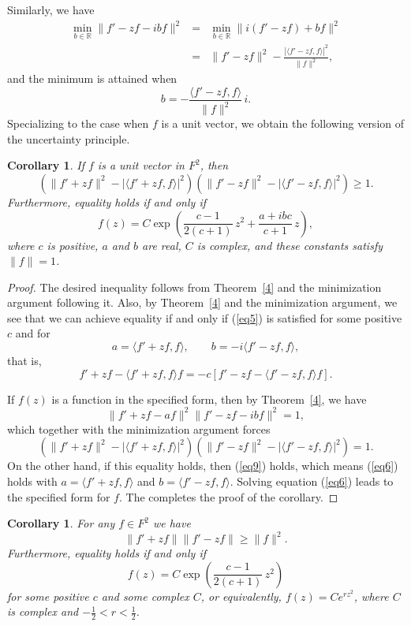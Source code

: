 \documentclass[12pt,reqno]{amsart}
\newtheorem{cor}[thm]{Corollary}
\begin{document}
Similarly, we have
\begin{eqnarray*}
\min_{b\in{{\mathbb R}}}\|f'-zf-ibf\|^2&=&\min_{b\in{{\mathbb R}}}\|i(f'-zf)+bf\|^2\\
&=&\|f'-zf\|^2-\frac{|\langle f'-zf,f\rangle|^2}{\|f\|^2},
\end{eqnarray*}
and the minimum is attained when 
$$b=-\frac{\langle f'-zf,f\rangle}{\|f\|^2}\,i.$$
Specializing to the case when $f$ is a unit vector, we obtain the following version of the uncertainty principle.

\begin{cor}
If $f$ is a unit vector in $F^2$, then
$$(\|f'+zf\|^2-|\langle f'+zf,f\rangle|^2)(\|f'-zf\|^2-|\langle f'-zf,f\rangle|^2)\ge1.$$
Furthermore, equality holds if and only if 
$$f(z)=C\exp\left(\frac{c-1}{2(c+1)}\,z^2+\frac{a+ibc}{c+1}\,z\right),$$
where $c$ is positive, $a$ and $b$ are real, $C$ is complex, and these constants satisfy $\|f\|=1$.
\label{5}
\end{cor}

\begin{proof}
The desired inequality follows from Theorem~\ref{4} and the minimization argument following it. 
Also, by Theorem~\ref{4} and the minimization argument, we see that we can achieve equality 
if and only if (\ref{eq5}) is satisfied for some positive $c$ and for
$$a=\langle f'+zf,f\rangle,\qquad b=-i\langle f'-zf,f\rangle,$$
that is,
\begin{equation}
f'+zf-\langle f'+zf,f\rangle f=-c\left[f'-zf-\langle f'-zf,f\rangle f\right].
\label{eq9}
\end{equation}

If $f(z)$ is a function in the specified form, then by Theorem~\ref{4}, we have
$$\|f'+zf-af\|^2\|f'-zf-ibf\|^2=1,$$
which together with the minimization argument forces
$$(\|f'+zf\|^2-|\langle f'+zf,f\rangle|^2)(\|f'-zf\|^2-|\langle f'-zf,f\rangle|^2)=1.$$
On the other hand, if this equality holds, then (\ref{eq9}) holds, which means (\ref{eq6}) holds with
$a=\langle f'+zf,f\rangle$ and $b=\langle f'-zf,f\rangle$. Solving equation (\ref{eq6}) leads to the
specified form for $f$. The completes the proof of the corollary.
\end{proof}

\begin{cor}
For any $f\in F^2$ we have
$$\|f'+zf\|\|f'-zf\|\ge\|f\|^2.$$
Furthermore, equality holds if and only if
$$f(z)=C\exp\left(\frac{c-1}{2(c+1)}\,z^2\right)$$
for some positive $c$ and some complex $C$, or equivalently, $f(z)=Ce^{rz^2}$, where $C$ is complex and
$-\frac12<r<\frac12$.
\label{6}
\end{cor}
\end{document}

